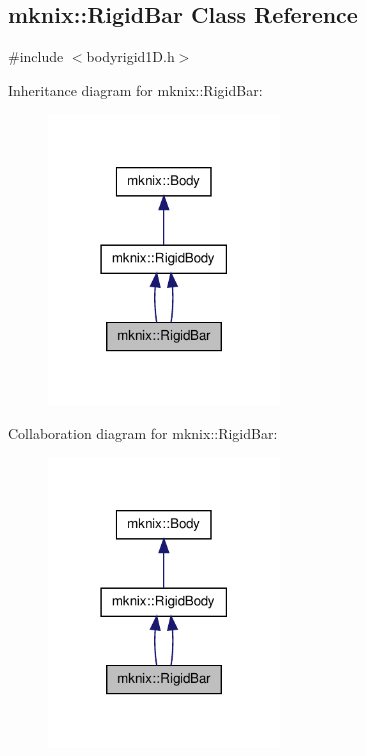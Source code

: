 \hypertarget{classmknix_1_1_rigid_bar}{\subsection{mknix\-:\-:Rigid\-Bar Class Reference}
\label{classmknix_1_1_rigid_bar}
}


{\ttfamily \#include $<$bodyrigid1\-D.\-h$>$}



Inheritance diagram for mknix\-:\-:Rigid\-Bar\-:\nopagebreak
\begin{figure}[H]
\begin{center}
\leavevmode
\includegraphics[width=174pt]{da/d1e/classmknix_1_1_rigid_bar__inherit__graph}
\end{center}
\end{figure}


Collaboration diagram for mknix\-:\-:Rigid\-Bar\-:\nopagebreak
\begin{figure}[H]
\begin{center}
\leavevmode
\includegraphics[width=174pt]{d7/df8/classmknix_1_1_rigid_bar__coll__graph}
\end{center}
\end{figure}
